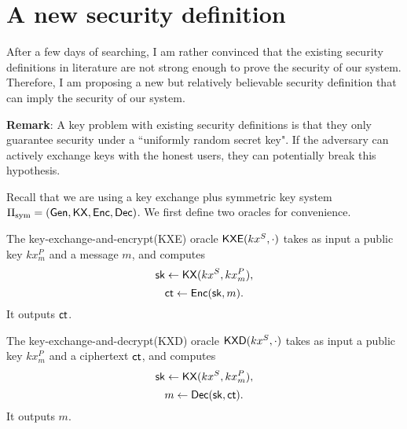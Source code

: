 \section{A new security definition}
\label{sec:IND-CCPKA}
After a few days of searching, I am rather convinced that the existing security definitions in literature are not strong enough to prove the security of our system. Therefore, I am proposing a new but relatively believable security definition that can imply the security of our system.

\textbf{Remark}: A key problem with existing security definitions is that they only guarantee security under a ``uniformly random secret key". If the adversary can actively exchange keys with the honest users, they can potentially break this hypothesis.

Recall that we are using a key exchange plus symmetric key system $\Pi_{\text{sym}} = (\mathsf{Gen}, \mathsf{KX}, \mathsf{Enc}, \mathsf{Dec})$. We first define two oracles for convenience.

\begin{definition}
The key-exchange-and-encrypt(KXE) oracle $\mathsf{KXE}(kx^S, \cdot)$ takes as input a public key $kx_m^P$ and a message $m$, and computes
$${\mathsf{sk}} \leftarrow \mathsf{KX}(kx^S, kx_m^P),$$
$$\mathsf{ct} \leftarrow \mathsf{Enc}({\mathsf{sk}}, m).$$
It outputs $\mathsf{ct}$.

The key-exchange-and-decrypt(KXD) oracle $\mathsf{KXD}(kx^S, \cdot)$ takes as input a public key $kx_m^P$ and a ciphertext $\mathsf{ct}$, and computes
$${\mathsf{sk}} \leftarrow \mathsf{KX}(kx^S, kx_m^P),$$
$$m \leftarrow \mathsf{Dec}({\mathsf{sk}}, \mathsf{ct}).$$
It outputs $m$.
\end{definition}

